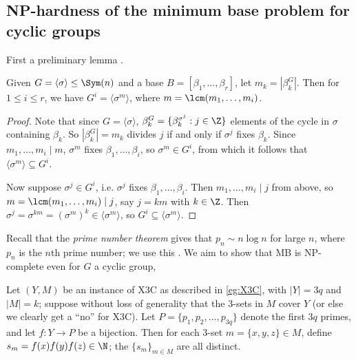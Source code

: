 \subsection{NP-hardness of the minimum base problem for cyclic groups}

First a preliminary lemma .

\begin{lemma}\label{lem:blaha_cyclic_stabiliser}
    Given $G = \langle \sigma \rangle \leq \Sym(n)$ and a base $B = [\beta_1,\dotsc,\beta_r]$, let $m_k = |\beta_k^G|$. Then for $1 \leq i \leq r$, we have $G^i = \langle \sigma^m \rangle$, where $m = \lcm(m_1,\dotsc,m_i)$.
\end{lemma}

\begin{proof}
    Note that since $G = \langle \sigma \rangle$,  $\beta_k^G = \{\beta_k^{\sigma^j} : j \in \Z\}$  elements of the cycle in $\sigma$ containing $\beta_k$. So $|\beta_k^G| = m_k$ divides $j$ if and only if $\sigma^j$ fixes $\beta_k$. Since $m_1,\dotsc,m_i \mid m$,  $\sigma^m$ fixes $\beta_1,\dotsc,\beta_i$, so $\sigma^m \in G^i$, from which it follows that $\langle \sigma^m \rangle \subseteq G^i$.

    Now suppose $\sigma^j \in G^i$, i.e. $\sigma^j$ fixes $\beta_1,\dotsc,\beta_i$. Then $m_1,\dotsc,m_i \mid j$ from above, so $m = \lcm(m_1,\dotsc,m_i) \mid j$, say $j = km$ with $k \in \Z$. Then $\sigma^j = \sigma^{km} = (\sigma^m)^k \in \langle \sigma^m \rangle$, so $G^i \subseteq \langle \sigma^m \rangle$.
\end{proof}

Recall that the \textit{prime number theorem} gives that $p_n \sim n\log n$ for large $n$, where $p_n$ is the $n$th prime number; we use this . We aim to show that MB is NP-complete even for $G$ a cyclic group, 

Let $(Y,M)$ be an instance of X3C as described in \autoref{eg:X3C}, with $|Y| = 3q$ and $|M| = k$; suppose without loss of generality that the 3-sets in $M$ cover $Y$ (or else we clearly get a ``no'' for X3C). Let $P = \{p_1,p_2,\dotsc,p_{3q}\}$ denote the first $3q$ primes, and let $f : Y \to P$ be a bijection. Then for each 3-set $m = \{x,y,z\} \in M$, define $s_m = f(x)f(y)f(z) \in \N$; the $\{s_m\}_{m \in M}$ are all distinct.

